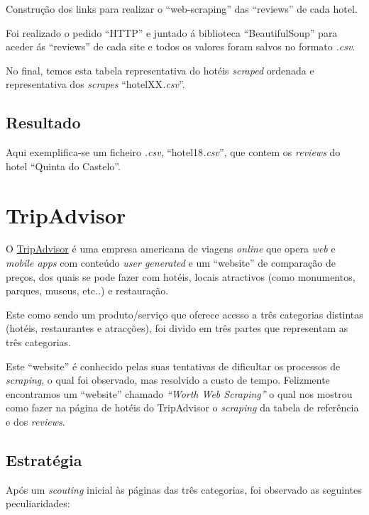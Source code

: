 Construção dos links para realizar o ``web-scraping'' das ``reviews'' de cada hotel.

Foi realizado o pedido ``HTTP'' e juntado á biblioteca ``BeautifulSoup'' para aceder ás ``reviews'' de cada site e todos os valores foram salvos no formato \textit{.csv}.

No final, temos esta tabela representativa do hotéis \textit{scraped} ordenada e representativa dos \textit{scrapes} ``hotelXX\textit{.csv}''.



\subsection{Resultado}

Aqui exemplifica-se um ficheiro \textit{.csv}, ``hotel18\textit{.csv}'', que contem os \textit{reviews} do hotel ``Quinta do Castelo''.


\section{TripAdvisor}

O \href{https://www.tripadvisor.pt/}{TripAdvisor} é uma empresa americana de viagens \textit{online} que opera \textit{web} e \textit{mobile apps} com conteúdo \textit{user generated} e um ``website'' de comparação de preços, dos quais se pode fazer com hotéis, locais atractivos (como monumentos, parques, museus, etc..) e restauração.

Este como sendo um produto/serviço que oferece acesso a três categorias distintas (hotéis, restaurantes e atracções), foi divido em três partes que representam as três categorias.

Este ``website'' é conhecido pelas suas tentativas de dificultar os processos de \textit{scraping}, o qual foi observado, mas resolvido a custo de tempo. Felizmente encontramos um ``website'' chamado \textit{``Worth Web Scraping''} o qual nos mostrou como fazer na página de hotéis do TripAdvisor o \textit{scraping} da tabela de referência e dos \textit{reviews}.

\subsection{Estratégia}

Após um \textit{scouting} inicial às páginas das três categorias, foi observado as seguintes peculiaridades:

